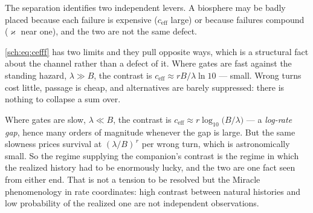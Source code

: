 The separation identifies two independent levers. A biosphere may be
badly placed because each failure is expensive ($c_{\mathrm{eff}}$
large) or because failures compound ($\varkappa$ near one), and the two are not
the same defect.

\begin{remark}
\label{sch:rem:tension}
\eqref{sch:eq:cefff} has two limits and they pull opposite ways, which
is a structural fact about the channel rather than a defect of it. Where gates are fast against the standing hazard, $\lambda\gg B$,
the contrast is $c_{\mathrm{eff}}\approx rB/\lambda\ln10$ ---
small. Wrong turns cost little, passage is cheap, and alternatives are
barely suppressed: there is nothing to collapse a sum over.

Where gates are slow, $\lambda\ll B$, the contrast is
$c_{\mathrm{eff}}\approx r\log_{10}\bigl(B/\lambda\bigr)$ --- a
\emph{log-rate gap}, hence many orders of magnitude whenever the gap is
large. But the same slowness prices survival at
$(\lambda/B)^{\,r}$ per wrong turn, which is astronomically
small. So the regime supplying the companion's contrast is the regime in which
the realized history had to be enormously lucky, and the two are one
fact seen from either end. That is not a tension to be resolved but the
Miracle phenomenology in rate coordinates: high contrast between natural
histories and low probability of the realized one are not independent
observations.
\end{remark}

